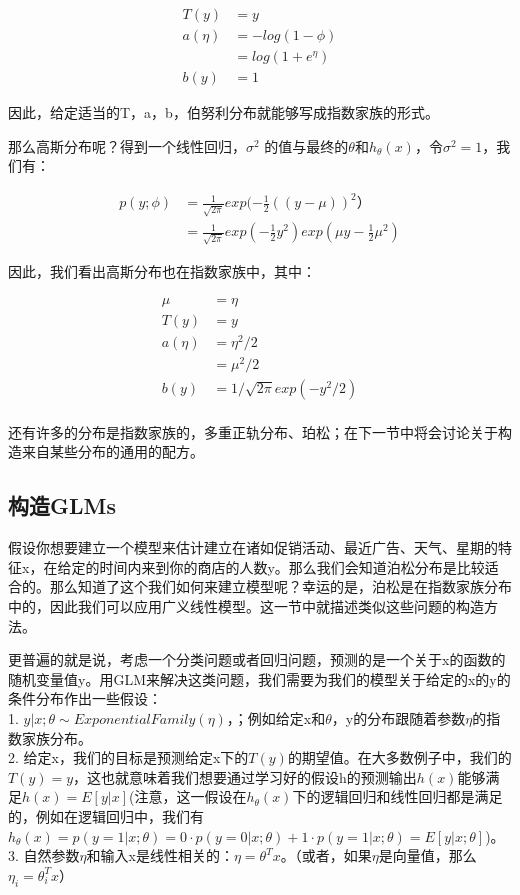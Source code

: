 \documentclass[UTF8]{ctexart}
\begin{document}
\begin{align*}
T(y) & = y\\
a(\eta) & = -log(1-\phi)\\
& = log(1+e^{\eta})\\
b(y) & = 1
\end{align*}

因此，给定适当的T，a，b，伯努利分布就能够写成指数家族的形式。


那么高斯分布呢？得到一个线性回归，$\sigma^{2}$ 的值与最终的$\theta$和$h_{\theta}(x)$，令$\sigma^{2}=1$，我们有：

\begin{align*}
p(y;\phi) & = \frac{1}{\sqrt{2\pi}} exp(-\frac{1}{2}((y-\mu))^{2}）\\
& = \frac{1}{\sqrt{2\pi}} exp(-\frac{1}{2}y^{2}) exp(\mu y - \frac{1}{2}\mu^{2})
\end{align*}

因此，我们看出高斯分布也在指数家族中，其中：

\begin{align*}
\mu & = \eta\\
T(y) & = y\\ 
a(\eta) & = \eta^{2} /2 \\
& = \mu^{2} /2\\ 
b(y) & = {1/\sqrt{2\pi}} exp (-y^{2}/2)\\ 
\end{align*}


还有许多的分布是指数家族的，多重正轨分布、珀松；在下一节中将会讨论关于构造来自某些分布的通用的配方。



\subsection{构造GLMs}

假设你想要建立一个模型来估计建立在诸如促销活动、最近广告、天气、星期的特征x，在给定的时间内来到你的商店的人数y。那么我们会知道泊松分布是比较适合的。那么知道了这个我们如何来建立模型呢？幸运的是，泊松是在指数家族分布中的，因此我们可以应用广义线性模型。这一节中就描述类似这些问题的构造方法。

更普遍的就是说，考虑一个分类问题或者回归问题，预测的是一个关于x的函数的随机变量值y。用GLM来解决这类问题，我们需要为我们的模型关于给定的x的y的条件分布作出一些假设：\\
1. $y|x;\theta \sim ExponentialFamily(\eta)$，；例如给定x和$\theta$，y的分布跟随着参数$\eta$的指数家族分布。\\
2. 给定x，我们的目标是预测给定x下的$T(y)$的期望值。在大多数例子中，我们的$T(y)=y$，这也就意味着我们想要通过学习好的假设h的预测输出$h(x)$能够满足$h(x)=E[y|x]$(注意，这一假设在$h_{\theta}(x)$下的逻辑回归和线性回归都是满足的，例如在逻辑回归中，我们有$h_{\theta}(x)=p(y=1|x;\theta)=0\cdot p(y=0|x;\theta)+1\cdot p(y=1|x;\theta)=E[y|x;\theta]$)。\\
3. 自然参数$\eta$和输入x是线性相关的：$\eta = \theta^{T} x$。（或者，如果$\eta$是向量值，那么$\eta_{i}= \theta_{i}^{T} x$）
\end{document}

